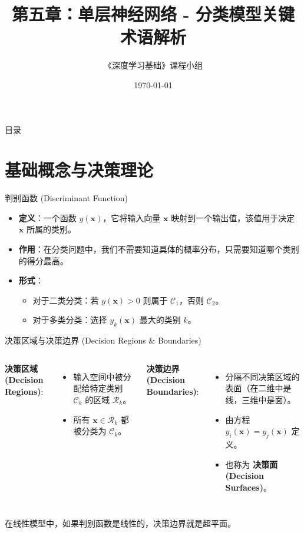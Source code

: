 \documentclass[12pt, aspectratio=169]{beamer}
\title{第五章：单层神经网络 - 分类模型关键术语解析}
\author{《深度学习基础》课程小组}
\date{\today}
\newcommand{\vect}[1]{\mathbf{#1}}
\begin{document}
\begin{frame}
    \titlepage
\end{frame}

\begin{frame}{目录}
    \tableofcontents
\end{frame}

\section{基础概念与决策理论}

\begin{frame}{判别函数 (Discriminant Function)}
    \begin{itemize}
        \item \textbf{定义}：一个函数 $y(\vect{x})$，它将输入向量 $\vect{x}$ 映射到一个输出值，该值用于决定 $\vect{x}$ 所属的类别。
        \item \textbf{作用}：在分类问题中，我们不需要知道具体的概率分布，只需要知道哪个类别的得分最高。
        \item \textbf{形式}：
        \begin{itemize}
            \item 对于二类分类：若 $y(\vect{x}) > 0$ 则属于 $\mathcal{C}_1$，否则 $\mathcal{C}_2$。
            \item 对于多类分类：选择 $y_k(\vect{x})$ 最大的类别 $k$。
        \end{itemize}
    \end{itemize}
\end{frame}

\begin{frame}{决策区域与决策边界 (Decision Regions \& Boundaries)}
    \begin{columns}
        \textbf{决策区域 (Decision Regions)}:
        \begin{itemize}
            \item 输入空间中被分配给特定类别 $\mathcal{C}_k$ 的区域 $\mathcal{R}_k$。
            \item 所有 $\vect{x} \in \mathcal{R}_k$ 都被分类为 $\mathcal{C}_k$。
        \end{itemize}
        
        \textbf{决策边界 (Decision Boundaries)}:
        \begin{itemize}
            \item 分隔不同决策区域的表面（在二维中是线，三维中是面）。
            \item 由方程 $y_i(\vect{x}) = y_j(\vect{x})$ 定义。
            \item 也称为 \textbf{决策面 (Decision Surfaces)}。
        \end{itemize}
    \end{columns}
    \vspace{0.5cm}
    \begin{center}
        \small 在线性模型中，如果判别函数是线性的，决策边界就是超平面。
    \end{center}
\end{frame}
\end{document}
